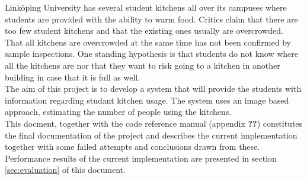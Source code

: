 Linköping University has several student kitchens all over its campuses where students are provided with the ability to warm food. Critics claim that there are too few student kitchens and that the existing ones usually are overcrowded. That all kitchens are overcrowded at the same time has not been confirmed by sample inspections. One standing hypothesis is that students do not know where all the kitchens are nor that they want to risk going to a kitchen in another building in case that it is full as well.\\

The aim of this project is to develop a system that will provide the students with information regarding studant kitchen usage. The system uses an image based approach, estimating the number of people using the kitchens.\\

This docment, together with the code reference manual (appendix \textbf{??}) constitutes the final documentation of the project and describes the current implementation together with some failed attempts and conclusions drawn from these. Performance results of the current implementation are presented in section \ref{sec:evaluation} of this document.